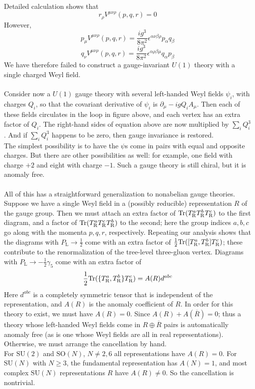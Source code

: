 \noindent
Detailed calculation shows that
\[r_{\rho}V^{\mu\nu\rho}(p,q,r) = 0\]
However,
\[p_{\mu}V^{\mu\nu\rho}(p,q,r) = \frac{ig^3}{8\pi^2}\epsilon^{\alpha\nu\beta\rho}p_{\alpha}q_{\beta}\]
\[q_{\nu}V^{\mu\nu\rho}(p,q,r) = \frac{ig^3}{8\pi^2}\epsilon^{\alpha\rho\beta\mu}q_{\alpha}p_{\beta}\]
We have therefore failed to construct a gauge-invariant $U(1)$ theory with a single charged Weyl field.
\\ \\
Consider now a $U(1)$ gauge theory with several left-handed Weyl fields $\psi_i$, with charges $Q_i$, so that the covariant derivative of $\psi_i$ is $\partial_{\mu} - igQ_iA_{\mu}$. Then each of these fields circulates in the loop in figure above, and each vertex has an extra factor of $Q_i$. The right-hand sides of equation above are now multiplied by $\sum_i Q_i^3$. And if $\sum_i Q_i^3$ happens to be zero, then gauge invariance is restored. 
\\
The simplest possibility is to have the $\psi$s come in
pairs with equal and opposite charges. But there are other possibilities as well: for example, one field with charge $+2$ and eight with charge $-1$. Such a gauge theory is still chiral, but it is anomaly free.
\\ \\
All of this has a straightforward generalization to nonabelian gauge theories. 
Suppose we have a single Weyl field in a (possibly reducible) representation $R$ of the gauge group. Then we must attach an extra factor of $\mathrm{Tr}(T^a_{\rm R} T^b_{\rm R} T^c_{\rm R})$ to the first diagram, and a factor of $\mathrm{Tr}(T^a_{\rm R} T^c_{\rm R} T^b_{\rm R})$ to the second; here the group indices $a,b,c$ go along with the momenta $p,q,r$, respectively.
Repeating our analysis shows that the diagrams with $P_{\mathrm{L}} \to \frac{1}{2}$ come with an extra factor of $\frac{1}{2}\mathrm{Tr}([T^a_{\rm R}, T^b_{\rm R}] T^c_{\rm R})$; these contribute to the renormalization of the tree-level three-gluon vertex. Diagrams with $P_{\mathrm{L}} \to - \frac{1}{2}\gamma_5$ come with an extra factor of
\[\frac{1}{2}\mathrm{Tr}(\{T^a_{\rm R}, T^b_{\rm R}\} T^c_{\rm R}) = A(R)d^{abc}\]
Here $d^{abc}$ is a completely symmetric tensor that is independent of the representation, and $A(R)$ is the anomaly coefficient of $R$. In order for this theory to exist, we must have $A(R) = 0$. 
Since $A(R) + A(\overline{R}) = 0$; thus a theory whose left-handed Weyl fields come in $R \oplus \overline{R}$ pairs is automatically anomaly free (as is one whose Weyl fields are all in real representations). Otherwise, we must arrange the cancellation by hand. 
\\
For $\mathrm{SU}(2)$ and $\mathrm{SO}(N)$, $N \neq 2,6$ all representations have $A(R) = 0$. For $\mathrm{SU}(N)$ with $N \geq 3$, the fundamental representation has $A(N) = 1$, and most complex $\mathrm{SU}(N)$ representations $R$ have $A(R) \neq 0$. So the cancellation is nontrivial.


